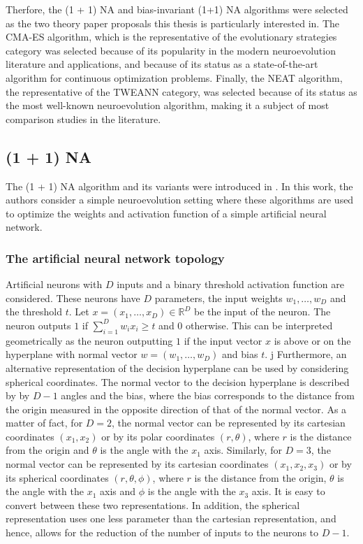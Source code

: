 Therfore, the (1 + 1) NA and bias-invariant (1+1) NA algorithms were selected as the two theory paper proposals this thesis is particularly interested in.
The CMA-ES algorithm, which is the representative of the evolutionary strategies category was selected because of its popularity in the modern neuroevolution literature
and applications, and because of its status as a state-of-the-art algorithm for continuous optimization problems.
Finally, the NEAT algorithm, the representative of the TWEANN category, was selected because of its status as the most well-known neuroevolution algorithm, making
it a subject of most comparison studies in the literature.

\subsection{(1 + 1) NA}

The (1 + 1) NA algorithm and its variants were introduced in \cite{na}.
In this work, the authors consider a simple neuroevolution setting where these algorithms are used to optimize the weights and activation function of
a simple artificial neural network.

\subsubsection{The artificial neural network topology}

Artificial neurons with $D$ inputs and a binary threshold activation function are considered.
These neurons have $D$ parameters, the input weights $w_1, \ldots, w_D$ and the threshold $t$.
Let $x = (x_1, \ldots, x_D) \in \mathds{R}^D$ be the input of the neuron. The neuron outputs $1$ if $\sum_{i=1}^D w_i x_i \geq t$ and $0$
otherwise.
This can be interpreted geometrically as the neuron outputting $1$ if the input vector $x$ is above or on the hyperplane with normal vector
$w = (w_1, \ldots, w_D)$ and bias $t$.
j
Furthermore, an alternative representation of the decision hyperplane can be used by considering spherical coordinates.
The normal vector to the decision hyperplane is described by by $D - 1$ angles and the bias, where the bias corresponds to the distance from the origin
measured in the opposite direction of that of the normal vector.
As a matter of fact, for $D = 2$, the normal vector can be represented by its cartesian coordinates $(x_1, x_2)$ or by its polar coordinates
$(r, \theta)$, where $r$ is the distance from the origin and $\theta$ is the angle with the $x_1$ axis. Similarly, for $D = 3$, the normal vector can
be represented by its cartesian coordinates $(x_1, x_2, x_3)$ or by its spherical coordinates $(r, \theta, \phi)$, where $r$ is the distance from the
origin, $\theta$ is the angle with the $x_1$ axis and $\phi$ is the angle with the $x_3$ axis.
It is easy to convert between these two representations. In addition, the spherical representation uses one less parameter than the cartesian
representation, and hence, allows for the reduction of the number of inputs to the neurons to $D - 1$.

